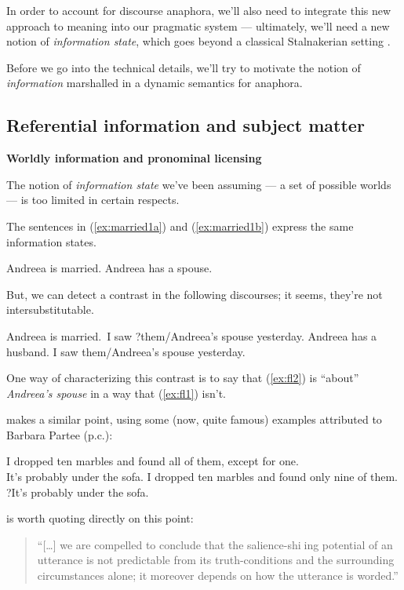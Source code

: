 \documentclass[nols,twoside,nofonts,nobib,nohyper]{tufte-handout}
\theoremstyle{definition}
\begin{document}
In order to account for discourse anaphora, we'll also need to integrate this new approach to meaning into our pragmatic system --- ultimately, we'll need a new notion of \textit{information state}, which goes beyond a classical Stalnakerian setting \citep{Stalnaker1976}.

Before we go into the technical details, we'll try to motivate the notion of \textit{information} marshalled in a dynamic semantics for anaphora.

\subsection{Referential information and subject matter}

\textbf{Worldly information and pronominal licensing}

The notion of \textit{information state} we've been assuming --- a set of possible worlds --- is too limited in certain respects.

The sentences in (\ref{ex:married1a}) and (\ref{ex:married1b}) express the same information states.

\pex
\a Andreea is married.\label{ex:married1a}
\a Andreea has a spouse.\label{ex:married1b}
\xe

But, we can detect a contrast in the following discourses; it seems, they're not intersubstitutable.

\pex
\a Andreea is married. I saw ?them/Andreea's spouse yesterday.\label{ex:fl1}
\a Andreea has a husband. I saw them/Andreea's spouse yesterday.\label{ex:fl2}
\xe

One way of characterizing this contrast is to say that (\ref{ex:fl2}) is \enquote{about} \textit{Andreea's spouse} in a way that (\ref{ex:fl1}) isn't.

\citet[p. 21]{Heim1982} makes a similar point, using some (now, quite famous) examples attributed to Barbara Partee (p.c.):

\pex
\a I dropped ten marbles and found all of them, except for one.\\
It's probably under the sofa.
\a I dropped ten marbles and found only nine of them.\\
?It's probably under the sofa.
\xe

\citet{Heim1982} is worth quoting directly on this point:

\begin{quotation}\enquote{[…] we are compelled to conclude that the salience-shiing potential of an utterance is not predictable from its truth-conditions and the surrounding
circumstances alone; it moreover depends on how the utterance is worded.}
\end{quotation}
\end{document}
